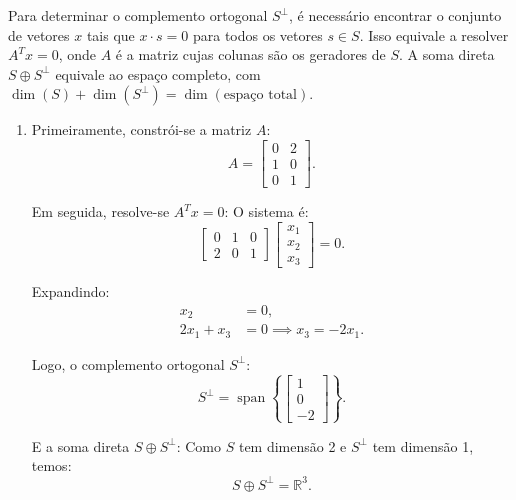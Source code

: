 \begin{resolution}
  Para determinar o complemento ortogonal \( S^\perp \), é necessário encontrar o conjunto de vetores \( x \) tais que \( x \cdot s = 0 \) para todos os vetores \( s \in S \). Isso equivale a resolver \( A^T x = 0 \), onde \( A \) é a matriz cujas colunas são os geradores de \( S \). A soma direta \( S \oplus S^\perp \) equivale ao espaço completo, com \( \dim(S) + \dim(S^\perp) = \dim(\text{espaço total}) \).

  \begin{enumerate}[label=\alph*)]
    \item Primeiramente, constrói-se a matriz \( A \):
          \[
            A = \begin{bmatrix}
              0 & 2 \\
              1 & 0 \\
              0 & 1
            \end{bmatrix}.
          \]

          Em seguida, resolve-se \( A^T x = 0 \):
          O sistema é:
          \[
            \begin{bmatrix}
              0 & 1 & 0 \\
              2 & 0 & 1
            \end{bmatrix}
            \begin{bmatrix}
              x_1 \\
              x_2 \\
              x_3
            \end{bmatrix}
            = 0.
          \]

          Expandindo:
          \[
            \begin{aligned}
              x_2        & = 0,                      \\
              2x_1 + x_3 & = 0 \implies x_3 = -2x_1.
            \end{aligned}
          \]

          Logo, o complemento ortogonal \( S^\perp \):
          \[
            S^\perp = \operatorname{span}\left\{
            \begin{bmatrix}
              1 \\ 0 \\ -2
            \end{bmatrix}
            \right\}.
          \]

          E a soma direta \( S \oplus S^\perp \):
          Como \( S \) tem dimensão 2 e \( S^\perp \) tem dimensão 1, temos:
          \[
            S \oplus S^\perp = \mathbb{R}^3.
          \]



\end{enumerate}
\end{resolution}
